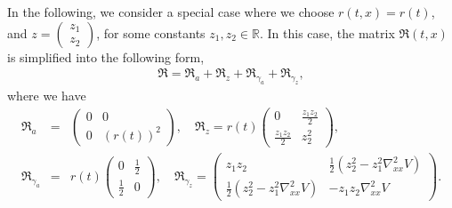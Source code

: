 \documentclass[11pt,reqno]{amsart}
\newcommand{\beaa}{\begin{eqnarray*}}
\newcommand{\eeaa}{\end{eqnarray*}}
\def\hR{\mathbb{R}}
\begin{document}
In the following, we consider a special case where we choose $r(t,x)=r(t)$, and $z=\begin{pmatrix}
	z_1\\
	z_2
\end{pmatrix}$, for some constants $z_1,z_2\in\hR$. In this case, the matrix $\mathfrak R(t,x)$ is simplified into the following form, 
\beaa 
\mathfrak R= \mathfrak R_a+\mathfrak R_z+\mathfrak R_{\gamma_a}+\mathfrak R_{\gamma_z},
\eeaa 
where we have 
\beaa 
\mathfrak R_a&=&\begin{pmatrix}
	0& 0\\
	0& (r(t))^2
\end{pmatrix},\quad \mathfrak R_z=r(t)\begin{pmatrix}
	0 & \frac{z_1z_2}{2}\\
	\frac{z_1z_2}{2}& z_2^2
\end{pmatrix},\\
\mathfrak R_{\gamma_a}&=&r(t) \begin{pmatrix}
	0&\frac{1}{2}\\
	\frac{1}{2}& 0
\end{pmatrix},\quad \mathfrak R_{\gamma_z}=\begin{pmatrix}
	z_1z_2&\frac{1}{2}( z_2^2-z_1^2\nabla_{xx}^2V)\\
	\frac{1}{2}( z_2^2-z_1^2\nabla_{xx}^2V) & -z_1z_2\nabla^2_{xx}V
\end{pmatrix}.
\eeaa 
\end{document}
